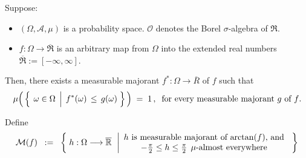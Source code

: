 \begin{theorem}
\mbox{}\vskip 0.1cm
\noindent
Suppose:
\begin{itemize}
\item
	$(\Omega,\mathcal{A},\mu)$ is a probability space.
	$\mathcal{O}$ denotes the Borel $\sigma$-algebra of $\Re$.
\item
	$f : \Omega \longrightarrow \overline{\Re}$
	is an arbitrary map from $\Omega$ into the extended real numbers
	$\overline{\Re} := [-\infty,\infty]$.
\end{itemize}
Then, there exists a measurable majorant $f^{*} : \Omega \longrightarrow \overline{R}$ of $f$ such that
\begin{equation*}
\mu\!\left(\,\left\{\;\left.\omega\overset{{\color{white}.}}{\in}\Omega\;\,\right\vert\; f^{*}(\omega) \,\leq\, g(\omega)\;\right\}\,\right)
\;=\;1\,,\;\;
\textnormal{for every measurable majorant $g$ of $f$}.
\end{equation*}
\end{theorem}
\proof
Define
\begin{equation*}
\mathcal{M}(f)
\;\; := \;\;
	\left\{\;
		h : \Omega \longrightarrow \overline{\Re}
	\;\,\left\vert
		\begin{array}{c}
		\textnormal{$h$ is measurable majorant of $\arctan(f)$, and}
		\\
		-\frac{\pi}{2} \leq h \leq \frac{\pi}{2} \;\, \mu\textnormal{-almost everywhere}
		\end{array}
	\right.
	\;\right\}
\end{equation*}

